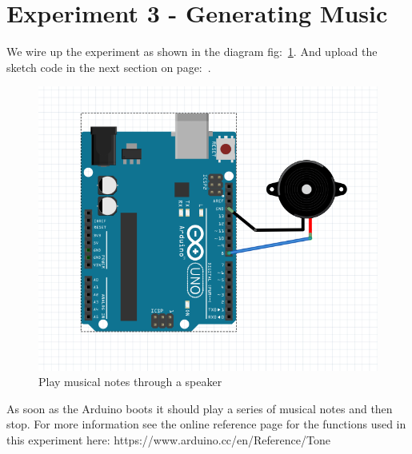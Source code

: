\chapter*{Experiment 3 - Generating Music}
We wire up the experiment as shown in the diagram fig:~\ref{fig:exp3_music}. And upload the sketch code in the next section on page:~\pageref{sketch:exp3}.

%
\begin{figure}[ht]
	\centering
	\includegraphics[width=12cm]{images/09}
	\caption{Play musical notes through a speaker \citep{fritzing-15}}
	\label{fig:exp3_music}
\end{figure}
%

As soon as the \gls{Arduino} boots it should play a series of musical notes and then stop. For more information see the online reference page for the functions used in this experiment here: https://www.arduino.cc/en/Reference/Tone

\newpage
